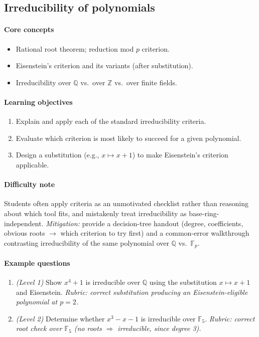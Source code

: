 \documentclass{article}
\begin{document}
\subsection{Irreducibility of polynomials}
\paragraph{Core concepts}
\begin{itemize}[nosep]
  \item Rational root theorem; reduction mod $p$ criterion.
  \item Eisenstein's criterion and its variants (after substitution).
  \item Irreducibility over $\mathbb{Q}$ vs.\ over $\mathbb{Z}$ vs.\ over finite fields.
\end{itemize}
\paragraph{Learning objectives}
\begin{enumerate}[nosep]
  \item Explain and apply each of the standard irreducibility criteria.
  \item Evaluate which criterion is most likely to succeed for a given polynomial.
  \item Design a substitution (e.g., $x \mapsto x+1$) to make Eisenstein's criterion applicable.
\end{enumerate}
\paragraph{Difficulty note}
Students often apply criteria as an unmotivated checklist rather than reasoning about which tool fits, and mistakenly treat irreducibility as base-ring-independent. \emph{Mitigation:} provide a decision-tree handout (degree, coefficients, obvious roots $\to$ which criterion to try first) and a common-error walkthrough contrasting irreducibility of the same polynomial over $\mathbb{Q}$ vs.\ $\mathbb{F}_p$.
\paragraph{Example questions}
\begin{enumerate}[nosep]
  \item \emph{(Level 1)} Show $x^4+1$ is irreducible over $\mathbb{Q}$ using the substitution $x \mapsto x+1$ and Eisenstein. \emph{Rubric: correct substitution producing an Eisenstein-eligible polynomial at $p=2$.}
  \item \emph{(Level 2)} Determine whether $x^3 - x - 1$ is irreducible over $\mathbb{F}_5$. \emph{Rubric: correct root check over $\mathbb{F}_5$ (no roots $\Rightarrow$ irreducible, since degree 3).}
\end{enumerate}
\end{document}
